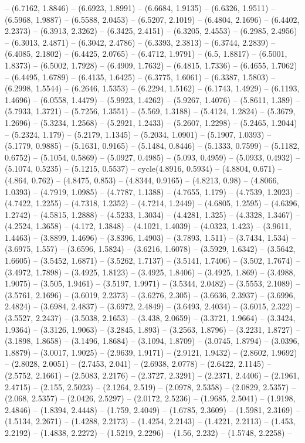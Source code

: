 -- (6.7162, 1.8846) -- (6.6923, 1.8991) -- (6.6684, 1.9135) -- (6.6326, 1.9511) -- (6.5968, 1.9887) -- (6.5588, 2.0453) -- (6.5207, 2.1019) -- (6.4804, 2.1696) -- (6.4402, 2.2373) -- (6.3913, 2.3262) -- (6.3425, 2.4151) -- (6.3205, 2.4553) -- (6.2985, 2.4956) -- (6.3013, 2.4871) -- (6.3042, 2.4786) -- (6.3393, 2.3813) -- (6.3744, 2.2839) -- (6.4085, 2.1802) -- (6.4425, 2.0765) -- (6.4712, 1.9791) -- (6.5, 1.8817) -- (6.5001, 1.8373) -- (6.5002, 1.7928) -- (6.4909, 1.7632) -- (6.4815, 1.7336) -- (6.4655, 1.7062) -- (6.4495, 1.6789) -- (6.4135, 1.6425) -- (6.3775, 1.6061) -- (6.3387, 1.5803) -- (6.2998, 1.5544) -- (6.2646, 1.5353) -- (6.2294, 1.5162) -- (6.1743, 1.4929) -- (6.1193, 1.4696) -- (6.0558, 1.4479) -- (5.9923, 1.4262) -- (5.9267, 1.4076) -- (5.8611, 1.389) -- (5.7933, 1.3721) -- (5.7256, 1.3551) -- (5.569, 1.3188) -- (5.4124, 1.2824) -- (5.3679, 1.2696) -- (5.3234, 1.2568) -- (5.2921, 1.2433) -- (5.2607, 1.2298) -- (5.2465, 1.2044) -- (5.2324, 1.179) -- (5.2179, 1.1345) -- (5.2034, 1.0901) -- (5.1907, 1.0393) -- (5.1779, 0.9885) -- (5.1631, 0.9165) -- (5.1484, 0.8446) -- (5.1333, 0.7599) -- (5.1182, 0.6752) -- (5.1054, 0.5869) -- (5.0927, 0.4985) -- (5.093, 0.4959) -- (5.0933, 0.4932) -- (5.1074, 0.5235) -- (5.1215, 0.5537) -- cycle(4.8916, 0.5934) -- (4.8804, 0.671) -- (4.864, 0.762) -- (4.8475, 0.853) -- (4.8344, 0.9165) -- (4.8213, 0.98) -- (4.8066, 1.0393) -- (4.7919, 1.0985) -- (4.7787, 1.1388) -- (4.7655, 1.179) -- (4.7539, 1.2023) -- (4.7422, 1.2255) -- (4.7318, 1.2352) -- (4.7214, 1.2449) -- (4.6805, 1.2595) -- (4.6396, 1.2742) -- (4.5815, 1.2888) -- (4.5233, 1.3034) -- (4.4281, 1.325) -- (4.3328, 1.3467) -- (4.2524, 1.3658) -- (4.172, 1.3848) -- (4.1021, 1.4039) -- (4.0323, 1.423) -- (3.9611, 1.4463) -- (3.8899, 1.4696) -- (3.8396, 1.4903) -- (3.7893, 1.511) -- (3.7434, 1.534) -- (3.6975, 1.557) -- (3.6596, 1.5824) -- (3.6216, 1.6078) -- (3.5929, 1.6342) -- (3.5642, 1.6605) -- (3.5452, 1.6871) -- (3.5262, 1.7137) -- (3.5141, 1.7406) -- (3.502, 1.7674) -- (3.4972, 1.7898) -- (3.4925, 1.8123) -- (3.4925, 1.8406) -- (3.4925, 1.869) -- (3.4988, 1.9075) -- (3.505, 1.9461) -- (3.5197, 1.9971) -- (3.5344, 2.0482) -- (3.5553, 2.1089) -- (3.5761, 2.1696) -- (3.6019, 2.2373) -- (3.6276, 2.305) -- (3.6636, 2.3937) -- (3.6996, 2.4824) -- (3.6984, 2.4837) -- (3.6972, 2.4849) -- (3.6493, 2.4034) -- (3.6015, 2.322) -- (3.5527, 2.2437) -- (3.5038, 2.1653) -- (3.438, 2.0659) -- (3.3721, 1.9664) -- (3.3424, 1.9364) -- (3.3126, 1.9063) -- (3.2845, 1.893) -- (3.2563, 1.8796) -- (3.2231, 1.8727) -- (3.1898, 1.8658) -- (3.1496, 1.8684) -- (3.1094, 1.8709) -- (3.0745, 1.8794) -- (3.0396, 1.8879) -- (3.0017, 1.9025) -- (2.9639, 1.9171) -- (2.9121, 1.9432) -- (2.8602, 1.9692) -- (2.8028, 2.0051) -- (2.7453, 2.041) -- (2.6938, 2.0778) -- (2.6422, 2.1145) -- (2.5752, 2.1661) -- (2.5083, 2.2176) -- (2.3727, 2.3291) -- (2.2371, 2.4406) -- (2.1961, 2.4715) -- (2.155, 2.5023) -- (2.1264, 2.519) -- (2.0978, 2.5358) -- (2.0829, 2.5357) -- (2.068, 2.5357) -- (2.0426, 2.5297) -- (2.0172, 2.5236) -- (1.9685, 2.5041) -- (1.9198, 2.4846) -- (1.8394, 2.4448) -- (1.759, 2.4049) -- (1.6785, 2.3609) -- (1.5981, 2.3169) -- (1.5134, 2.2671) -- (1.4288, 2.2173) -- (1.4254, 2.2143) -- (1.4221, 2.2113) -- (1.453, 2.2192) -- (1.4838, 2.2272) -- (1.5219, 2.2296) -- (1.56, 2.232) -- (1.5748, 2.2258) -- 
